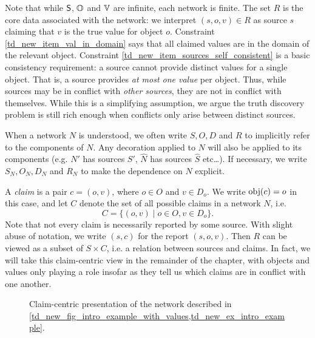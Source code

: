 Note that while $\S$, $\O$ and $\V$ are infinite, each network is finite. The
set $R$ is the core data associated with the network: we interpret $(s, o, v)
\in R$ as source $s$ claiming that $v$ is the true value for object $o$.
Constraint \cref{td_new_item_val_in_domain} says that all claimed values are in
the domain of the relevant object. Constraint
\cref{td_new_item_sources_self_consistent} is a basic consistency
requirement: a source cannot provide distinct values for a single object. That
is, a source provides \emph{at most one value} per object.  Thus, while sources
may be in conflict with \emph{other sources}, they are not in conflict with
themselves.  While this is a simplifying assumption, we argue the truth
discovery problem is still rich enough when conflicts only arise between
distinct sources.

When a network $N$ is understood, we often write $S, O, D$ and $R$ to
implicitly refer to the components of $N$. Any decoration applied to $N$ will
also be applied to its components (e.g. $N'$ has sources $S'$, $\hat{N}$ has
sources $\hat{S}$ etc\ldots). If necessary, we write $S_N, O_N, D_N$ and $R_N$
to make the dependence on $N$ explicit.

A \emph{claim} is a pair $c = (o, v)$, where $o \in O$ and $v \in D_o$. We
write $\obj(c) = o$ in this case, and let $C$ denote the set of all possible
claims in a network $N$, i.e.
\[
    C = \{(o, v) \mid o \in O, v \in D_o\}.
\]
Note that not every claim is necessarily reported by some source. With slight
abuse of notation, we write $(s, c)$ for the report $(s, o, v)$. Then $R$ can
be viewed as a subset of $S \times C$, i.e. a relation between sources and
claims. In fact, we will take this claim-centric view in the remainder of the
chapter, with objects and values only playing a role insofar as they tell us
which claims are in conflict with one another.

\begin{figure}
    \centering
    \caption{
        Claim-centric presentation of the network described in
        \cref{td_new_fig_intro_example_with_values,td_new_ex_intro_example}.
    }
    \label{td_new_fig_intro_example}
\end{figure}

